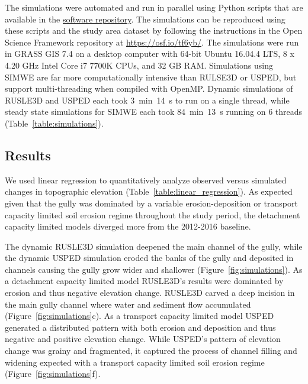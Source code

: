 \documentclass[gmd, manuscript]{copernicus}
\begin{document}
The simulations were automated and run in parallel
using Python scripts that are available in the 
\href{https://github.com/baharmon/landscape_evolution}{software repository}.
The simulations can be reproduced using these scripts
and the study area dataset 
by following the instructions 
in the Open Science Framework repository 
at \url{https://osf.io/tf6yb/}.
The simulations were run 
in GRASS GIS 7.4 
on a desktop computer 
with 64-bit Ubuntu 16.04.4 LTS,
8 x 4.20 GHz Intel Core i7 7700K CPUs,
and 32 GB RAM. 
Simulations using SIMWE 
are far more computationally intensive
than RULSE3D or USPED, 
but support multi-threading 
when compiled with OpenMP. 
Dynamic simulations of RUSLE3D and USPED each took
3~\unit{min}~14~\unit{s} to run on a single thread, 
while steady state simulations for SIMWE each took 
84~\unit{min}~13~\unit{s} running on 6 threads
(Table~\ref{table:simulations}).


\subsection{Results}

We used linear regression to quantitatively analyze 
observed versus simulated changes in topographic elevation
(Table~\ref{table:linear_regression}).
As expected given that the gully was dominated 
by a variable erosion-deposition 
or  transport capacity limited soil erosion regime 
throughout the study period,
the detachment capacity limited models 
diverged more from the 2012-2016 baseline. 

The dynamic RUSLE3D simulation
deepened the main channel of the gully,
while the dynamic USPED simulation
eroded the banks of the gully
and deposited in channels
causing the gully grow wider and shallower
(Figure~\ref{fig:simulations}). 
%
As a detachment capacity limited model
RUSLE3D's results were
dominated by erosion and 
thus negative elevation change.
%
RUSLE3D carved a deep incision 
in the main gully channel
where water and sediment flow accumulated
(Figure~\ref{fig:simulations}c). 
%
As a transport capacity limited model
USPED generated a distributed pattern
with both erosion and deposition and thus
negative and positive elevation change. 
%
While USPED's pattern of elevation change
was grainy and fragmented, 
it captured the process of channel 
filling and widening expected with 
a transport capacity limited soil erosion regime
(Figure~\ref{fig:simulations}f). 
\end{document}
